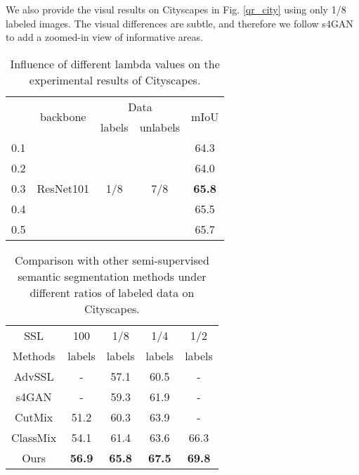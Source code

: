 We also provide the visul results on Cityscapes in Fig. \ref{qr_city} using only 1/8 labeled images.
The visual differences are subtle, and therefore we follow s4GAN \cite{mittal2019semi} to add a zoomed-in view of informative areas.

\begin{table}[h]
\small
\centering
\caption{Influence of different lambda values on the experimental results of Cityscapes.}
\begin{tabular}{c|c|c|c|c}
\hline 
\multirow{2}{*}{} & \multirow{2}{*}{backbone} & \multicolumn{2}{c|}{Data} & \multirow{2}{*}{mIoU} \\\cline{3-4}
						&      &  labels   & unlabels        &                       \\\hline
 0.1 & \multirow{5}{*}{ResNet101} & \multirow{5}{*}{1/8} & \multirow{5}{*}{7/8} & 64.3\\
 0.2 &  &  &      & 64.0 \\
 0.3 &  &  &      & \textbf{65.8} \\
 0.4 &  &  &      & 65.5 \\
 0.5 &  &  &      & 65.7 \\\hline
\end{tabular}
\label{impact_lambda_city}
\end{table}


\begin{table}[h]
\small
\centering
\caption{Comparison with other semi-supervised semantic segmentation methods under different ratios of labeled data on Cityscapes.}
\begin{tabular}{c|c|c|c|c}
\hline
	SSL & 100 & 1/8 & 1/4 & 1/2 \\
	Methods & labels & labels & labels & labels \\\hline
	AdvSSL \cite{2018Adversarial} & - & 57.1 & 60.5 & - \\
	s4GAN \cite{mittal2019semi} & - & 59.3 & 61.9 & - \\
	CutMix \cite{french2020semi} & 51.2 & 60.3 & 63.9 & - \\
	ClassMix \cite{french2020semi} & 54.1 & 61.4 & 63.6 & 66.3 \\
	Ours & \textbf{56.9} & \textbf{65.8} & \textbf{67.5} & \textbf{69.8}\\\hline
\end{tabular}
\label{the experiments of city}
\end{table}


